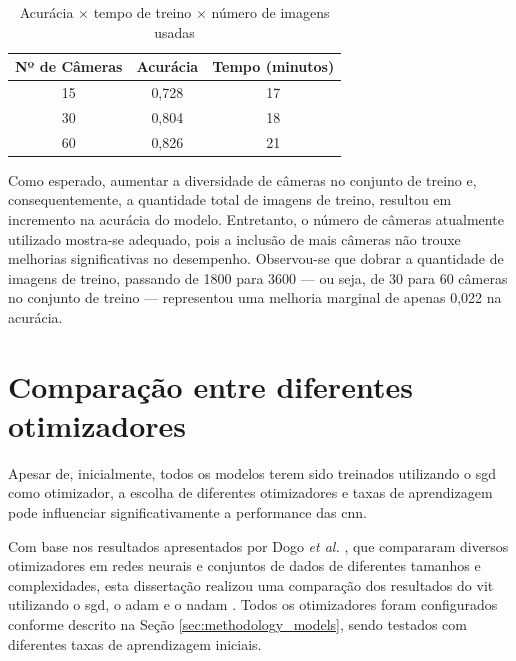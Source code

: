 \begin{table}[!ht]
\begin{center}
\caption{Acurácia $\times$ tempo de treino $\times$ número de imagens usadas}
\label{tab:trainingimages}
\begin{tabular}{c|cc}
\toprule
\textbf{\textbf{Nº de Câmeras}} & \textbf{Acurácia} & \textbf{Tempo (minutos)}\\
\midrule
15 &  0,728 & 17\\
30 & 0,804 & 18 \\
60 & 0,826 & 21 \\
\bottomrule
\end{tabular}
\end{center}
\end{table}

Como esperado, aumentar a diversidade de câmeras no conjunto de treino e, consequentemente, a quantidade total de imagens de treino, resultou em incremento na acurácia do modelo.
Entretanto, o número de câmeras atualmente utilizado mostra-se adequado, pois a inclusão de mais câmeras não trouxe melhorias significativas no desempenho.
Observou-se que dobrar a quantidade de imagens de treino, passando de 1800 para 3600 — ou seja, de 30 para 60 câmeras no conjunto de treino — representou uma melhoria marginal de apenas 0,022 na acurácia.


\section{Comparação entre diferentes otimizadores}\label{sec:optimizer}
Apesar de, inicialmente, todos os modelos terem sido treinados utilizando o \acrshort{sgd} como otimizador, a escolha de diferentes otimizadores e taxas de aprendizagem pode influenciar significativamente a performance das \acrshort{cnn}.

Com base nos resultados apresentados por Dogo \textit{et al.} \cite{Dogo2022optimizers}, que compararam diversos otimizadores em redes neurais e conjuntos de dados de diferentes tamanhos e complexidades, esta dissertação realizou uma comparação dos resultados do \acrshort{vit} utilizando o \acrshort{sgd}, o \acrlong{adam} \cite{adam} e o \acrlong{nadam} \cite{nadam}.
Todos os otimizadores foram configurados conforme descrito na Seção \ref{sec:methodology_models}, sendo testados com diferentes taxas de aprendizagem iniciais.

